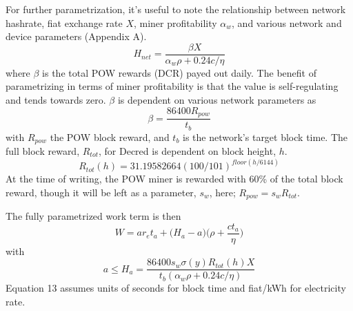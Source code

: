 \documentclass[a4paper,12pt]{article}
\begin{document}
For further parametrization, it's useful to note the relationship between network hashrate, fiat exchange rate $ X $, miner profitability $ \alpha_w $, and various network and device parameters (Appendix A).
%
\begin{equation}
H_{net} = \frac{ \beta X }{ \alpha_w \rho + 0.24 c / \eta  }
\end{equation}
%
where $\beta$ is the total POW rewards (DCR) payed out daily. The benefit of parametrizing in terms of miner profitability is that the value is self-regulating and tends towards zero. $\beta$ is dependent on various network parameters as
%
\begin{equation}
\beta = \frac{ 86400 R_{pow} }{ t_b } 
\end{equation}
%
with $R_{pow}$ the POW block reward, and $t_b$ is the network's target block time. The full block reward, $R_{tot}$, for Decred is dependent on block height, $h$.
%
\begin{equation}
R_{tot}(h) = 31.19582664(100/101)^{floor(h/6144)}
\end{equation}
%
At the time of writing, the POW miner is rewarded with 60\% of the total block reward, though it will be left as a parameter, $ s_w $, here; $R_{pow} = s_w R_{tot}$. 

The fully parametrized work term is then 
%
\begin{equation}
W = ar_et_a +\Big( H_a - a \Big) \Big(\rho + \frac{ c t_a }{ \eta } \Big)
\end{equation}
%
with
%
%
\begin{equation}
a \le H_a = \frac{ 86400 s_w \sigma(y) R_{tot}(h) X }{ t_b (\alpha_w \rho + 0.24 c / \eta) }
\end{equation}
%
Equation 13 assumes units of seconds for block time and fiat/kWh for electricity rate.
\end{document}

